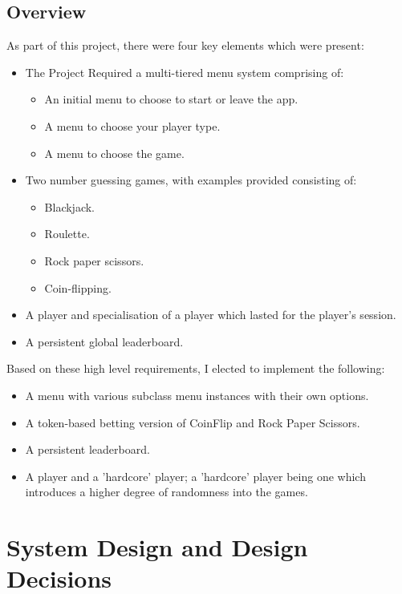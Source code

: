 \documentclass{scrreprt}
\begin{document}
\section{Overview}\label{Overview}
As part of this project, there were four key elements which were present:
\begin{itemize}
	\item The Project Required a multi-tiered menu system comprising of:
	\begin{itemize}
		\item An initial menu to choose to start or leave the app.
		\item A menu to choose your player type.
		\item A menu to choose the game.
	\end{itemize}
	\item Two number guessing games, with examples provided consisting of:
\begin{itemize}
	\item Blackjack.
	\item Roulette.
	\item Rock paper scissors.
	\item Coin-flipping.
\end{itemize}
	\item A player and specialisation of a player which lasted for the player's session.
	\item A persistent global leaderboard.
\end{itemize}
\noindent Based on these high level requirements, I elected to implement the following:
\begin{itemize}
	\item A menu with various subclass menu instances with their own options.
	\item A token-based betting version of CoinFlip and Rock Paper Scissors.
	\item A persistent leaderboard.
	\item A player and a 'hardcore' player; a 'hardcore' player being one which introduces a higher degree of randomness into the games.
\end{itemize}

\chapter{System Design and Design Decisions}\label{Design}
\end{document}
